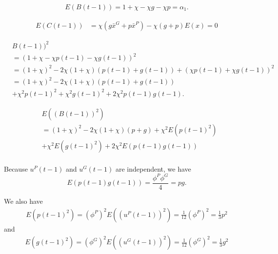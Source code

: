 \documentclass[12pt]{article}
\begin{document}
\begin{equation}
\label{eq:a_t_mean}
\begin{aligned}
E( B(t-1) ) = 1 + \chi - \chi g - \chi p = \alpha_{1}.
\end{aligned}
\end{equation}

\begin{equation}
\label{eq:b_t_mean}
\begin{aligned}
E( C(t-1) ) & = \chi (g \bar{x}^{G} + p \bar{x}^{P})  - \chi (g + p) E(x)
 = 0
\end{aligned}
\end{equation}

\begin{equation}
\begin{aligned}
& B(t-1) )^{2} \\
& = ( 1 + \chi - \chi p(t-1) - \chi g(t-1) )^{2} \\
& = (1 + \chi)^{2} - 2 \chi(1 + \chi) ( p(t-1) + g(t-1) ) + ( \chi p(t-1) + \chi g(t-1) )^{2} \\
& = (1 + \chi)^{2} - 2 \chi(1 + \chi) ( p(t-1) + g(t-1) ) \\
& + \chi^{2} p(t-1)^{2} + \chi^{2} g(t-1)^{2} + 2 \chi^{2} p(t-1) g(t-1).
\end{aligned} 
\end{equation}

\begin{equation}
\label{eq:a_t_2_mean}
\begin{aligned}
& E( ( B(t-1) )^{2} ) \\
& = (1 + \chi)^{2} - 2 \chi(1 + \chi) ( p + g )  + \chi^{2} E( p(t-1)^{2} ) \\
& + \chi^{2} E( g( t-1 )^{2} )
+ 2 \chi^{2} E( p(t-1) g(t-1) ) \\
\end{aligned}
\end{equation}

Because $ u^{P}(t-1) $ and $ u^{G}(t-1) $ are independent,
we have
\begin{equation}
E( p(t-1) g(t-1) ) = \frac{ \phi^{P} \phi^{G} }{4} = p g.
\end{equation}

We also have
\begin{equation}
\begin{aligned}
E( p(t-1)^{2} ) = ( \phi^{P} )^{2} E( (u^{P}(t-1))^{2} ) = \frac{1}{12} ( \phi^{P} )^{2} = \frac{1}{3} p^{2}
\end{aligned}
\end{equation}
and
\begin{equation}
\begin{aligned}
E( g(t-1)^{2} ) = ( \phi^{G} )^{2} E( (u^{G}(t-1))^{2} ) = \frac{1}{12} ( \phi^{G} )^{2} = \frac{1}{3} g^{2}
\end{aligned}
\end{equation} 
\end{document}
